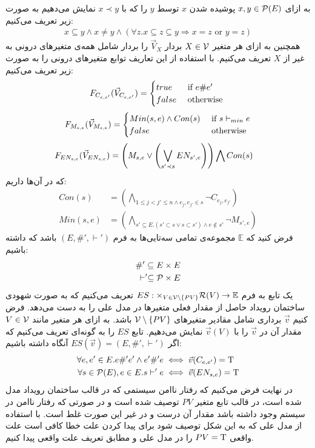 به ازای
$x,y \in \mathcal{P}(E)$
پوشیده
شدن 
$x$
توسط
$y$
را که با 
$x \prec y$
نمایش می‌دهیم به صورت زیر تعریف می‌کنیم:
\begin{align*}
    x \subseteq y \wedge x \neq y \wedge
    (\forall z. x \subseteq z \subseteq y \Rightarrow x = z
    \text{ or } y = z)
\end{align*}
همچنین به ازای هر متغیر 
$X \in \mathcal{V}$
بردار
$\vec V_X$
را بردار شامل همه‌ی متغیر‌های درونی به غیر از 
$X$
تعریف می‌کنیم.
با استفاده از این تعاریف 
توابع متغیر‌های درونی را به صورت زیر تعریف می‌کنیم:
$$
    F_{C_{e,e'}}(\vec V_{C_{e,e'}}) = \begin{cases}
        true  & \text{ if } e \# e'\\
        false & \text{ otherwise }
    \end{cases}
$$
$$
    F_{M_{s,e}}(\vec V_{M_{s,e}}) = \begin{cases}
        Min(s,e) \wedge Con(s) & \text{ if } s \vdash_{min} e \\
        false                  & \text{ otherwise }
    \end{cases}
$$
\begin{align*}
    F_{EN_{s,e}}(\vec V_{EN_{s,e}}) & =
    \left(
    M_{s,e} \vee
    \left(
    \bigvee_{s'\prec s}EN_{s',e}
    \right)
    \right)
    \bigwedge
    Con(s)
\end{align*}
که در آن‌ها داریم:
\begin{align*}
    Con(s)   & =   \left(
    \bigwedge_{ 1\leq j<j' \leq n \wedge e_j,e_{j'} \in s}
    \neg C_{e_j,e_{j'}}
    \right)               \\
    Min(s,e) & = \left(
    \bigwedge_{s' \subseteq E. (s' \subset s \vee s \subset s')
        \wedge e \notin s'}
    \neg M_{s',e}
    \right)
\end{align*}
فرض کنید که
$\mathbb{E}$
مجموعه‌ی تمامی سه‌تایی‌ها به فرم
$(E,\#',\vdash')$
باشد که داشته باشیم:
\begin{align*}
    \#' \subseteq E \times E \\
    \vdash' \subseteq \mathcal{P}\times E
\end{align*}
یک تابع به فرم
$ES: \times_{V \in \mathcal{V}\setminus \{PV\}} \mathcal{R}(V) \rightarrow \mathbb{E}$
تعریف می‌کنیم که به صورت شهودی ساختمان رویداد حاصل از مقدار فعلی متغیر‌ها در مدل علی را به دست می‌دهد.
فرض کنیم 
$\vec v$
برداری شامل مقادیر متغیرهای
$\mathcal{V} \setminus \{PV\}$
باشد.
به ازای هر متغیر مانند 
$V \in \mathcal{V}$
مقدار آن در 
$\vec v$
را با
$\vec v(V)$
نمایش می‌دهیم.
تابع 
$ES$
را به گونه‌ای تعریف می‌کنیم که اگر 
$ES(\vec v) = (E,\#',\vdash')$
آنگاه داشته باشیم:
\begin{align*}
    \forall e,e' \in E. e \#' e' \wedge e' \#' e
     & \iff \vec{v}(C_{e,e'}) = \mathrm{T} \\
    \forall s \in \mathcal{P}(E), e \in E.  s \vdash' e
     & \iff \vec{v}(EN_{s,e}) = \mathrm{T}
\end{align*}
در نهایت فرض می‌کنیم که رفتار نا‌امن
 سیستمی که در قالب ساختمان رویداد مدل شده است، در قالب تابع متغیر 
$PV$
توصیف شده است و در صورتی که رفتار نا‌امن در سیستم وجود داشته باشد مقدار آن درست و در غیر این صورت غلط است.
با استفاده از مدل علی که به این شکل توصیف شود برای پیدا کردن علت خطا کافی است علت واقعی 
$PV=\mathrm{T}$
را در مدل علی و مطابق تعریف علت واقعی پیدا کنیم.

